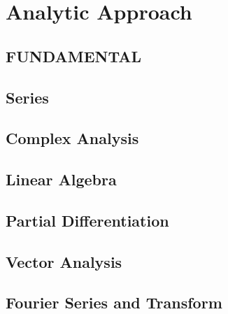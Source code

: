\documentclass[10pt]{report}
\begin{document}
\pagestyle{empty}
\nocite{*}

\clearpage
\chapter{Analytic Approach}
\clearpage
\section{FUNDAMENTAL}
\thispagestyle{empty}

\clearpage

\clearpage

\section{Series}

\clearpage

\section{Complex Analysis}

\clearpage

\clearpage

\section{Linear Algebra}

\clearpage

\clearpage

\section{Partial Differentiation}

\clearpage

\clearpage

\section{Vector Analysis}

\clearpage

\section{Fourier Series and Transform}

\clearpage
\end{document}
